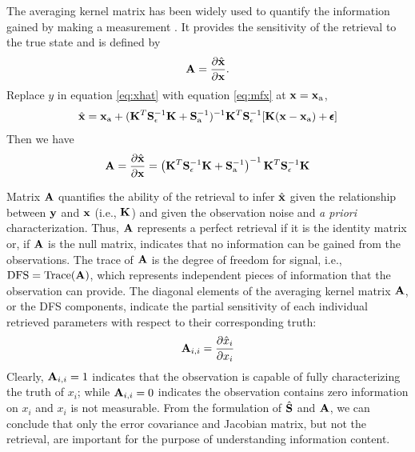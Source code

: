 The averaging kernel matrix has been widely used to quantify the
information gained by making a measurement \citep[e.g.,][]{Rodgers98,
Hasekamp05a, Frankenberg12, Sanghavi12}. It provides the sensitivity of 
the retrieval to the true state and is defined by 
\begin{equation}
\mathbf{A}=\frac{\partial{\hat{\mathbf{x}}}}{\partial\mathbf{x}}. 
\end{equation}
Replace $y$ in equation \eqref{eq:xhat} with equation \eqref{eq:mfx}
at $\mathbf{x}=\mathbf{x}_\text{a}$, 
\begin{equation}
\hat{\mathbf{x}} = \mathbf{x}_\text{a} + (\mathbf{K}^T\mathbf{S}_\epsilon^{-1}\mathbf{K}+\mathbf{S}_\text{a}^{-1})^{-1}
\mathbf{K}^T\mathbf{S}_\epsilon^{-1}[\mathbf{K}(\mathbf{x}-\mathbf{x}_\text{a})+\pmb{\epsilon}] 
\end{equation}
Then we have
\begin{equation}
\mathbf{A}=\frac{\partial{\hat{\mathbf{x}}}}{\partial\mathbf{x}}
    =\left(\mathbf{K}^T\mathbf{S}_\epsilon^{-1}\mathbf{K}+\mathbf{S}_\text{a}^{-1}\right)^{-1}
     \mathbf{K}^T\mathbf{S}_\epsilon^{-1}\mathbf{K}
\end{equation}

Matrix $\mathbf{A}$ quantifies the ability of the retrieval to infer
$\hat{\mathbf{x}}$ given the relationship between $\mathbf{y}$ and $\mathbf{x}$ (i.e.,
$\mathbf{K}$) and given the observation noise and \textit{a priori} characterization. 
Thus, $\mathbf{A}$ represents a perfect retrieval if it is the identity matrix or,
if $\mathbf{A}$ is the null matrix, indicates that no information can be gained
from the observations. The trace of $\mathbf{A}$ is the
degree of freedom for signal, i.e., $\text{DFS}=\text{Trace}(\mathbf{A})$, 
which represents independent pieces of information that the observation 
can provide. The diagonal elements of the averaging kernel matrix $\mathbf{A}$, 
or the DFS components, indicate the partial sensitivity of each 
individual retrieved parameters with respect to their corresponding truth: 
\begin{equation}
\mathbf{A}_{i,i}=\frac{\partial\hat{x}_i}{\partial x_i}
\end{equation}
Clearly, $\mathbf{A}_{i,i}=1$ indicates that the observation is capable
of fully characterizing the truth of $x_i$; while $\mathbf{A}_{i,i}=0$ 
indicates the observation contains zero information on $x_i$ and $x_i$ 
is not measurable. From the formulation of $\hat{\mathbf{S}}$ and $\mathbf{A}$, 
we can conclude that only the error covariance and Jacobian matrix, 
but not the retrieval, are important for the purpose of understanding 
information content.

